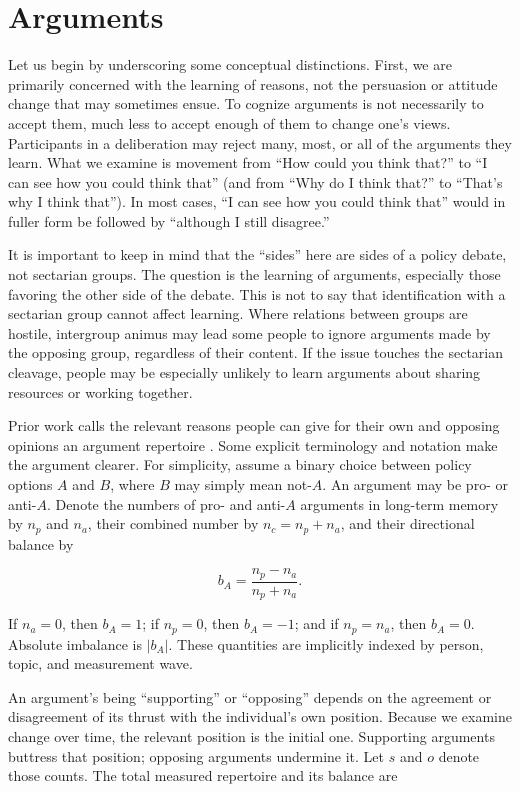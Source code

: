 \documentclass{article}
\begin{document}
\section{Arguments}

Let us begin by underscoring some conceptual distinctions. First, we are primarily concerned
with the learning of reasons, not the persuasion or attitude change that may sometimes ensue.
To cognize arguments is not necessarily to accept them, much less to accept enough of them to
change one's views. Participants in a deliberation may reject many, most, or all of the
arguments they learn. What we examine is movement from ``How could you think that?'' to ``I
can see how you could think that'' (and from ``Why do I think that?'' to ``That's why I think
that''). In most cases, ``I can see how you could think that'' would in fuller form be followed
by ``although I still disagree.''

It is important to keep in mind that the ``sides'' here are sides of a policy debate, not
sectarian groups. The question is the learning of arguments, especially those favoring the
other side of the debate. This is not to say that identification with a sectarian group cannot
affect learning. Where relations between groups are hostile, intergroup animus may lead some
people to ignore arguments made by the opposing group, regardless of their content. If the
issue touches the sectarian cleavage, people may be especially unlikely to learn arguments
about sharing resources or working together.

Prior work calls the relevant reasons people can give for their own and opposing opinions an
argument repertoire \citep{cappella2002argument}. Some explicit terminology and notation
make the argument clearer. For simplicity, assume a binary choice between policy options $A$
and $B$, where $B$ may simply mean not-$A$. An argument may be pro- or anti-$A$. Denote the
numbers of pro- and anti-$A$ arguments in long-term memory by $n_p$ and $n_a$, their combined
number by $n_c=n_p+n_a$, and their directional balance by

\begin{equation}
b_A=\frac{n_p-n_a}{n_p+n_a}.
\end{equation}

If $n_a=0$, then $b_A=1$; if $n_p=0$, then $b_A=-1$; and if $n_p=n_a$, then
$b_A=0$. Absolute imbalance is $|b_A|$. These quantities are implicitly indexed by person,
topic, and measurement wave.

An argument's being ``supporting'' or ``opposing'' depends on the agreement or disagreement of
its thrust with the individual's own position. Because we examine change over time, the
relevant position is the initial one. Supporting arguments buttress that position; opposing
arguments undermine it. Let $s$ and $o$ denote those counts. The total measured repertoire and
its balance are
\end{document}

